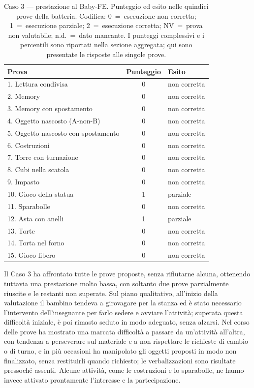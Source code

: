 \begin{table}[htbp]
\centering
\caption[Caso 3 --- prestazione al Baby-FE]{Caso 3 --- prestazione al Baby-FE. Punteggio ed esito nelle quindici prove della batteria. Codifica: 0~=~esecuzione non corretta; 1~=~esecuzione parziale; 2~=~esecuzione corretta; NV~=~prova non valutabile; n.d.~=~dato mancante. I punteggi complessivi e i percentili sono riportati nella sezione aggregata; qui sono presentate le risposte alle singole prove.}
\label{tab:caso3_prove}
\begin{tabular}{|l|c|l|}
\toprule
\textbf{Prova} & \textbf{Punteggio} & \textbf{Esito} \\
\midrule
1. Lettura condivisa & 0 & non corretta \\
2. Memory & 0 & non corretta \\
3. Memory con spostamento & 0 & non corretta \\
4. Oggetto nascosto (A-non-B) & 0 & non corretta \\
5. Oggetto nascosto con spostamento & 0 & non corretta \\
6. Costruzioni & 0 & non corretta \\
7. Torre con turnazione & 0 & non corretta \\
8. Cubi nella scatola & 0 & non corretta \\
9. Impasto & 0 & non corretta \\
10. Gioco della statua & 1 & parziale \\
11. Sparabolle & 0 & non corretta \\
12. Asta con anelli & 1 & parziale \\
13. Torte & 0 & non corretta \\
14. Torta nel forno & 0 & non corretta \\
15. Gioco libero & 0 & non corretta \\
\bottomrule
\end{tabular}
\end{table}

Il Caso 3 ha affrontato tutte le prove proposte, senza rifiutarne alcuna, ottenendo tuttavia una prestazione molto bassa, con soltanto due prove parzialmente riuscite e le restanti non superate. Sul piano qualitativo, all'inizio della valutazione il bambino tendeva a girovagare per la stanza ed è stato necessario l'intervento dell'insegnante per farlo sedere e avviare l'attività; superata questa difficoltà iniziale, è poi rimasto seduto in modo adeguato, senza alzarsi. Nel corso delle prove ha mostrato una marcata difficoltà a passare da un'attività all'altra, con tendenza a perseverare sul materiale e a non rispettare le richieste di cambio o di turno, e in più occasioni ha manipolato gli oggetti proposti in modo non finalizzato, senza restituirli quando richiesto; le verbalizzazioni sono risultate pressoché assenti. Alcune attività, come le costruzioni e lo sparabolle, ne hanno invece attivato prontamente l'interesse e la partecipazione.

